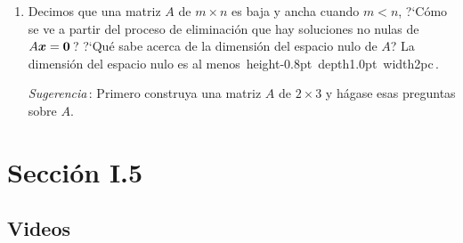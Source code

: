 \documentclass[12pt,a4paper]{article}
\newcommand{\bi}[1]{\hbox{\boldmath$#1$}}
\newcommand\1{\mbox{\,\vrule height-0.8pt depth1.0pt width2pc\,}}
\newcommand\2{\mbox{\,\vrule height-0.8pt depth1.0pt width1pc\,}}
\begin{document}
\begin{enumerate}
%
\vspace{-9pt}
Sea $A=\left[\begin{array}{@{\,}rr@{\,}}\bi{1}&\bi{3}\\\bi{2}&\bi{4}\\\end{array}\right]$\,. Aplique pivoteo completo para producir $P_1AP_2=LU$.


\vspace{5pt}


\item Decimos que una matriz $A$ de $m\times n$  es baja y ancha cuando $m<n$, ?`C\'omo se ve a partir del proceso de eliminaci\'on que hay soluciones no nulas de  $A\bi{x}=\bi{0}$\,? ?`Qu\'e sabe acerca de la dimensi\'on del espacio nulo de $A$? La dimensi\'on del espacio nulo es al menos \1.



\emph{Sugerencia}\,: Primero construya una matriz $A$ de $2 \times 3$ y h\'agase esas preguntas sobre $A$.

\end{enumerate}


\section{Sección I.5}

\subsection*{Videos}
\end{document}
